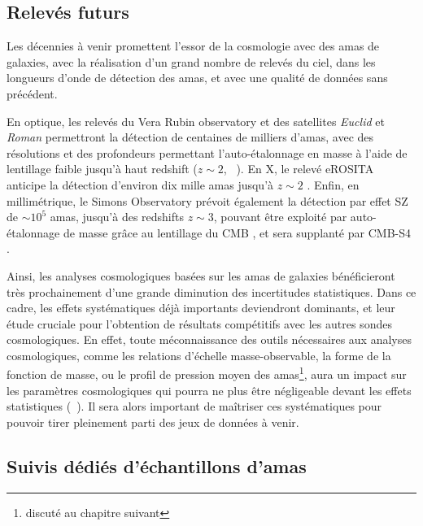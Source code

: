 \subsection{Relevés futurs}

Les décennies à venir promettent l'essor de la cosmologie avec des amas de galaxies, avec la réalisation d'un grand nombre de relevés du ciel, dans les longueurs d'onde de détection des amas, et avec une qualité de données sans précédent.

En optique, les relevés du Vera Rubin observatory et des satellites \textit{Euclid} et \textit{Roman} permettront la détection de centaines de milliers d'amas, avec des résolutions et des profondeurs permettant l'auto-étalonnage en masse à l'aide de lentillage faible jusqu'à haut redshift ($z \sim 2$, \eg\ \cite{lsst_science_collaboration_lsst_2009, sartoris_next_2016}).
En X, le relevé eROSITA anticipe la détection d'environ dix mille amas jusqu'à $z \sim 2$ \cite{merloni_erosita_2012}.
Enfin, en millimétrique, le Simons Observatory prévoit également la détection par effet SZ de $\sim 10^5$ amas, jusqu'à des redshifts $z \sim 3$, pouvant être exploité par auto-étalonnage de masse grâce au lentillage du CMB \cite{ade_simons_2019, louis_calibrating_2017}, et sera supplanté par CMB-S4 \cite{abazajian_cmb-s4_2016}.

Ainsi, les analyses cosmologiques basées sur les amas de galaxies bénéficieront très prochainement d'une grande diminution des incertitudes statistiques.
Dans ce cadre, les effets systématiques déjà importants deviendront dominants, et leur étude cruciale pour l'obtention de résultats compétitifs avec les autres sondes cosmologiques.
En effet, toute méconnaissance des outils nécessaires aux analyses cosmologiques, comme les relations d'échelle masse-observable, la forme de la fonction de masse, ou le profil de pression moyen des amas\footnote{discuté au chapitre suivant}, aura un impact sur les paramètres cosmologiques qui pourra ne plus être négligeable devant les effets statistiques (\eg\ \cite{ruppin_impact_2019-1, salvati_impact_2020, artis_impact_2021}).
Il sera alors important de maîtriser ces systématiques pour pouvoir tirer pleinement parti des jeux de données à venir.

\subsection{Suivis dédiés d'échantillons d'amas}\label{sec:follow_ups}

